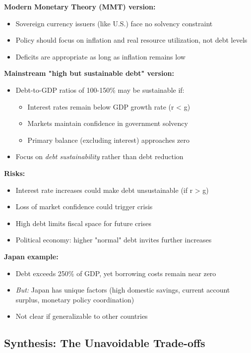 \documentclass[12pt,letterpaper]{article}
\begin{document}
\textbf{Modern Monetary Theory (MMT) version:}
\begin{itemize}
    \item Sovereign currency issuers (like U.S.) face no solvency constraint
    \item Policy should focus on inflation and real resource utilization, not debt levels
    \item Deficits are appropriate as long as inflation remains low
\end{itemize}

\textbf{Mainstream "high but sustainable debt" version:}
\begin{itemize}
    \item Debt-to-GDP ratios of 100-150\% may be sustainable if:
    \begin{itemize}
        \item Interest rates remain below GDP growth rate (r < g)
        \item Markets maintain confidence in government solvency
        \item Primary balance (excluding interest) approaches zero
    \end{itemize}
    \item Focus on \textit{debt sustainability} rather than debt reduction
\end{itemize}

\textbf{Risks:}
\begin{itemize}
    \item Interest rate increases could make debt unsustainable (if r > g)
    \item Loss of market confidence could trigger crisis
    \item High debt limits fiscal space for future crises
    \item Political economy: higher "normal" debt invites further increases
\end{itemize}

\textbf{Japan example:}
\begin{itemize}
    \item Debt exceeds 250\% of GDP, yet borrowing costs remain near zero
    \item \textit{But:} Japan has unique factors (high domestic savings, current account surplus, monetary policy coordination)
    \item Not clear if generalizable to other countries
\end{itemize}

\subsection{Synthesis: The Unavoidable Trade-offs}
\end{document}
